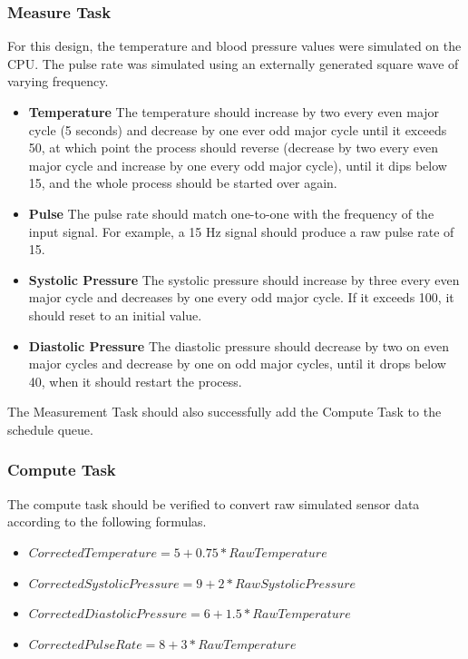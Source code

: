 \documentclass[12pt]{article} %
\begin{document}
    \subsubsection{Measure Task}
    For this design, the temperature and blood pressure values were simulated
    on the CPU.  The pulse rate was simulated using an externally generated
    square wave of varying frequency.  
    \begin{itemize}
      \item \textbf{Temperature} The temperature should increase by two every
	even major cycle (5 seconds) and decrease by one ever odd major cycle
	until it exceeds 50, at which point the process should reverse
	(decrease by two every even major cycle and increase by one every odd
	major cycle), until it dips below 15, and the whole process should be
	started over again. 
      \item \textbf{Pulse}  The pulse rate should match one-to-one with the
    frequency of the input signal.  For example, a 15 Hz signal should produce
    a raw pulse rate of 15.
      \item \textbf{Systolic Pressure} The systolic pressure should increase by
	three every even major cycle and decreases by one every odd major
	cycle. If it exceeds 100, it should reset to an initial value.
      \item \textbf{Diastolic Pressure} The diastolic pressure should decrease
	by two on even major cycles and decrease by one on odd major cycles,
	until it drops below 40, when it should restart the process.
    \end{itemize}

    The Measurement Task should also successfully add the Compute Task to the 
    schedule queue.

    \subsubsection{Compute Task}
    The compute task should be verified to convert raw simulated sensor data
    according to the following formulas.
    \begin{itemize}
      \item $CorrectedTemperature = 5 + 0.75 * RawTemperature$
      \item $CorrectedSystolicPressure = 9 + 2 * RawSystolicPressure$
      \item $CorrectedDiastolicPressure = 6 + 1.5 * RawTemperature$
      \item $CorrectedPulseRate = 8 + 3 * RawTemperature$
    \end{itemize}
\end{document}
